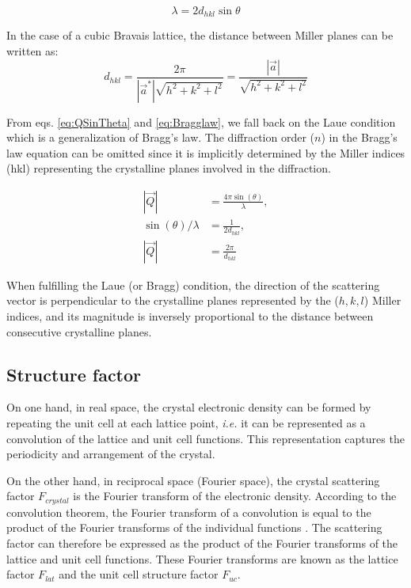 \begin{equation}
    \label{eq:Bragglaw}
    \lambda = 2d_{hkl} \sin{\theta}%
\end{equation}

In the case of a cubic Bravais lattice, the distance between Miller planes can be written as:
\begin{equation}
    \label{eq:Interplanarspacing}
    d_{hkl}=\frac{2\pi}{|\vec{a}^*|\sqrt{h^2 + k^2 + l^2}}=\frac{|\vec{a}|}{\sqrt{h^2 + k^2 + l^2}}
\end{equation}

From eqs. \ref{eq:QSinTheta} and \ref{eq:Bragglaw}, we fall back on the Laue condition which is a generalization of Bragg's law.
The diffraction order ($n$) in the Bragg's law equation can be omitted since it is implicitly determined by the Miller indices (hkl) representing the crystalline planes involved in the diffraction.

\begin{align}
    \label{eq:QandD1}
    |\vec{Q}| & = \frac{4\pi \sin(\theta)}{\lambda},\\
    \label{eq:QandD2}
    \sin(\theta) / \lambda & = \frac{1}{2d_{hkl}},\\
    \label{eq:QandD3}
    |\vec{Q}| & = \frac{2\pi}{d_{hkl}}
\end{align}{}

When fulfilling the Laue (or Bragg) condition, the direction of the scattering vector is perpendicular to the crystalline planes represented by the ($h, k, l$) Miller indices, and its magnitude is inversely proportional to the distance between consecutive crystalline planes.

\subsection{Structure factor} \label{sec:StructureFactor}

On one hand, in real space, the crystal electronic density can be formed by repeating the unit cell at each lattice point, \textit{i.e.} it can be represented as a convolution of the lattice and unit cell functions.
This representation captures the periodicity and arrangement of the crystal.

On the other hand, in reciprocal space (Fourier space), the crystal scattering factor $F_{crystal}$ is the Fourier transform of the electronic density.
According to the convolution theorem, the Fourier transform of a convolution is equal to the product of the Fourier transforms of the individual functions \parencite{Mcalister2003}.
The scattering factor can therefore be expressed as the product of the Fourier transforms of the lattice and unit cell functions.
These Fourier transforms are known as the lattice factor $F_{lat}$ and the unit cell structure factor $F_{uc}$.

